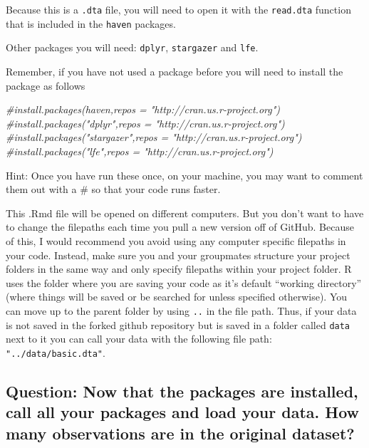 \documentclass[
]{article}
\newenvironment{Shaded}{\begin{snugshade}}{\end{snugshade}}
\newcommand{\CommentTok}[1]{\textcolor[rgb]{0.56,0.35,0.01}{\textit{#1}}}
\begin{document}
Because this is a \texttt{.dta} file, you will need to open it with the
\texttt{read.dta} function that is included in the \texttt{haven}
packages.

Other packages you will need: \texttt{dplyr}, \texttt{stargazer} and
\texttt{lfe}.

Remember, if you have not used a package before you will need to install
the package as follows

\begin{Shaded}
\begin{Highlighting}[]
\CommentTok{\#install.packages(\textquotesingle{}haven\textquotesingle{},repos = "http://cran.us.r{-}project.org")}
\CommentTok{\#install.packages("dplyr",repos = "http://cran.us.r{-}project.org")}
\CommentTok{\#install.packages("stargazer",repos = "http://cran.us.r{-}project.org")}
\CommentTok{\#install.packages("lfe",repos = "http://cran.us.r{-}project.org")}
\end{Highlighting}
\end{Shaded}

Hint: Once you have run these once, on your machine, you may want to
comment them out with a \# so that your code runs faster.

This .Rmd file will be opened on different computers. But you don't want
to have to change the filepaths each time you pull a new version off of
GitHub. Because of this, I would recommend you avoid using any computer
specific filepaths in your code. Instead, make sure you and your
groupmates structure your project folders in the same way and only
specify filepaths within your project folder. R uses the folder where
you are saving your code as it's default ``working directory'' (where
things will be saved or be searched for unless specified otherwise). You
can move up to the parent folder by using \texttt{..} in the file path.
Thus, if your data is not saved in the forked github repository but is
saved in a folder called \texttt{data} next to it you can call your data
with the following file path: \texttt{"../data/basic.dta"}.

\hypertarget{question-now-that-the-packages-are-installed-call-all-your-packages-and-load-your-data.-how-many-observations-are-in-the-original-dataset}{%
\subsection{Question: Now that the packages are installed, call all your
packages and load your data. How many observations are in the original
dataset?}\label{question-now-that-the-packages-are-installed-call-all-your-packages-and-load-your-data.-how-many-observations-are-in-the-original-dataset}}
\end{document}
